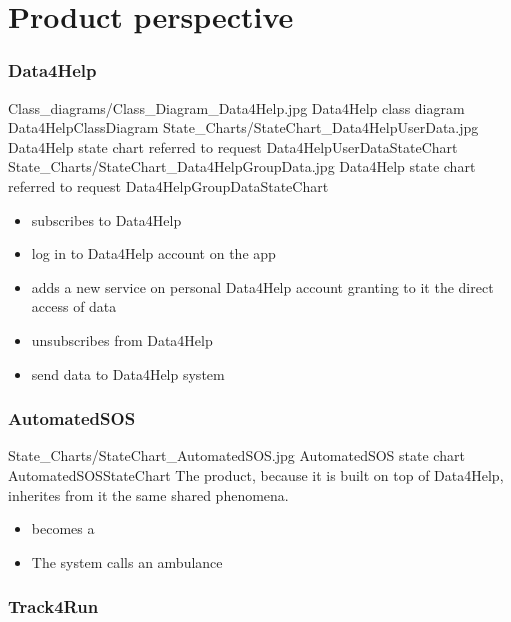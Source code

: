 \documentclass[../../rasd.tex]{subfiles}
\begin{document}
	
	\section{Product perspective}

		\subsubsection{Data4Help}

			\image {13cm} {Class_diagrams/Class_Diagram_Data4Help.jpg} {Data4Help class diagram} {Data4HelpClassDiagram}
			\image {13cm} {State_Charts/StateChart_Data4HelpUserData.jpg} {Data4Help state chart referred to  request} {Data4HelpUserDataStateChart}
			\image {13cm} {State_Charts/StateChart_Data4HelpGroupData.jpg} {Data4Help state chart referred to  request} {Data4HelpGroupDataStateChart}

			\begin{itemize}
				\item {} subscribes to Data4Help
				\item {} log in to Data4Help account on the app
				\item {} adds a new service on personal Data4Help account granting to it the direct access of data
				\item {} unsubscribes from Data4Help
				\item {} send data to Data4Help system
			\end{itemize}

		\subsubsection{AutomatedSOS}

			\image {13cm} {State_Charts/StateChart_AutomatedSOS.jpg} {AutomatedSOS state chart} {AutomatedSOSStateChart}
			The product, because it is built on top of Data4Help, inherites from it the same shared phenomena.

			\begin{itemize}
				\item {} becomes a 
				\item The system calls an ambulance
			\end{itemize}

		\subsubsection{Track4Run}
\end{document}
